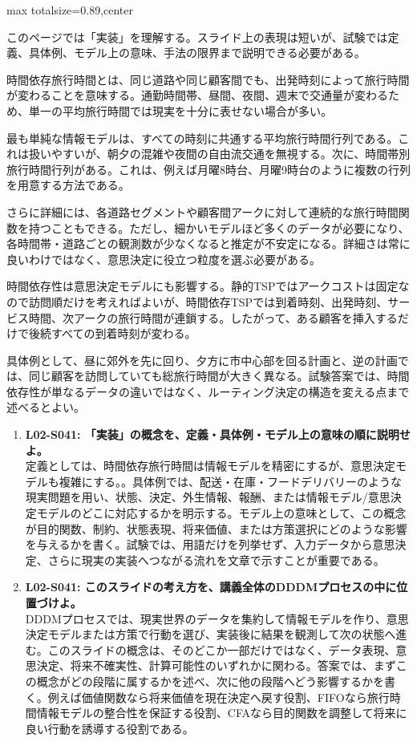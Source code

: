 \begin{minipage}[t]{0.58\textwidth}
\begin{adjustbox}{max totalsize={\textwidth}{0.89\textheight},center}
\begin{minipage}{\textwidth}\scriptsize
{}このページでは「実装」を理解する。スライド上の表現は短いが、試験では定義、具体例、モデル上の意味、手法の限界まで説明できる必要がある。\par
時間依存旅行時間とは、同じ道路や同じ顧客間でも、出発時刻によって旅行時間が変わることを意味する。通勤時間帯、昼間、夜間、週末で交通量が変わるため、単一の平均旅行時間では現実を十分に表せない場合が多い。\par
最も単純な情報モデルは、すべての時刻に共通する平均旅行時間行列である。これは扱いやすいが、朝夕の混雑や夜間の自由流交通を無視する。次に、時間帯別旅行時間行列がある。これは、例えば月曜8時台、月曜9時台のように複数の行列を用意する方法である。\par
さらに詳細には、各道路セグメントや顧客間アークに対して連続的な旅行時間関数を持つこともできる。ただし、細かいモデルほど多くのデータが必要になり、各時間帯・道路ごとの観測数が少なくなると推定が不安定になる。詳細さは常に良いわけではなく、意思決定に役立つ粒度を選ぶ必要がある。\par
時間依存性は意思決定モデルにも影響する。静的TSPではアークコストは固定なので訪問順だけを考えればよいが、時間依存TSPでは到着時刻、出発時刻、サービス時間、次アークの旅行時間が連鎖する。したがって、ある顧客を挿入するだけで後続すべての到着時刻が変わる。\par
具体例として、昼に郊外を先に回り、夕方に市中心部を回る計画と、逆の計画では、同じ顧客を訪問していても総旅行時間が大きく異なる。試験答案では、時間依存性が単なるデータの違いではなく、ルーティング決定の構造を変える点まで述べるとよい。\par{}\begin{enumerate}\item \textbf{L02-S041: 「実装」の概念を、定義・具体例・モデル上の意味の順に説明せよ。}\\定義としては、時間依存旅行時間は情報モデルを精密にするが、意思決定モデルも複雑にする。。具体例では、配送・在庫・フードデリバリーのような現実問題を用い、状態、決定、外生情報、報酬、または情報モデル/意思決定モデルのどこに対応するかを明示する。モデル上の意味として、この概念が目的関数、制約、状態表現、将来価値、または方策選択にどのような影響を与えるかを書く。試験では、用語だけを列挙せず、入力データから意思決定、さらに現実の実装へつながる流れを文章で示すことが重要である。\item \textbf{L02-S041: このスライドの考え方を、講義全体のDDDMプロセスの中に位置づけよ。}\\DDDMプロセスでは、現実世界のデータを集約して情報モデルを作り、意思決定モデルまたは方策で行動を選び、実装後に結果を観測して次の状態へ進む。このスライドの概念は、そのどこか一部だけではなく、データ表現、意思決定、将来不確実性、計算可能性のいずれかに関わる。答案では、まずこの概念がどの段階に属するかを述べ、次に他の段階へどう影響するかを書く。例えば価値関数なら将来価値を現在決定へ戻す役割、FIFOなら旅行時間情報モデルの整合性を保証する役割、CFAなら目的関数を調整して将来に良い行動を誘導する役割である。\end{enumerate}

\end{minipage}
\end{adjustbox}
\end{minipage}
